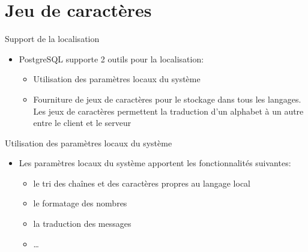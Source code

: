
\section{Jeu de caractères}


\begin{frame}[fragile]{Support de la localisation}

\begin{itemize}
   \item PostgreSQL supporte 2 outils pour la localisation:
   \begin{itemize}
      \item Utilisation des paramètres locaux du système
      \item Fourniture de jeux de caractères pour le stockage dans tous les langages. Les jeux de caractères permettent la traduction d'un alphabet à un autre entre le client et le serveur
   \end{itemize}
\end{itemize}

\begin{toile}
\end{toile}

\end{frame}


\begin{frame}[fragile]{Utilisation des paramètres locaux du système}

\begin{itemize}
   \item Les paramètres locaux du système apportent les fonctionnalités suivantes:
   \begin{itemize}
      \item le tri des chaînes et des caractères propres au langage local
      \item le formatage des nombres
      \item la traduction des messages
      \item \ldots
   \end{itemize}
\end{itemize}

\end{frame}

